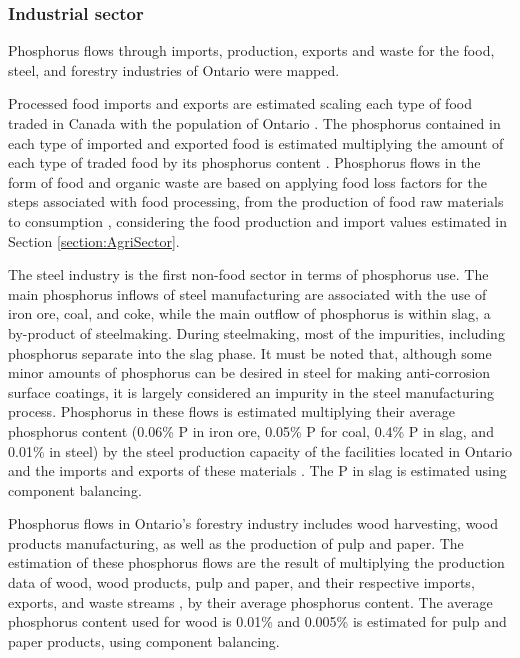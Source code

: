 \documentclass[authoryear]{elsarticle}
\begin{document}
\subsubsection{Industrial sector}
Phosphorus flows through imports, production, exports and waste for the food, steel, and forestry industries of Ontario were mapped.

Processed food imports and exports
are estimated scaling each type of food 
traded in Canada \citep{TradeDataOnlineCanada}
with the population of Ontario \citep{PopulationCanada}.
The phosphorus contained in each type of imported and exported food is estimated multiplying the amount of each type of traded food by its phosphorus content \citep{CanadianNutrientFile}. Phosphorus flows in the form of food and organic waste are based on applying food loss factors for the steps associated with food processing, from the production of food raw materials to consumption \citep{FoodLossesFAO}, considering the food production and import values estimated in Section \ref{section:AgriSector}.

The steel industry is the first non-food sector in terms of phosphorus use. The main phosphorus inflows of steel manufacturing are associated with the use of iron ore, coal, and coke, while the
main outflow of phosphorus is within slag, a by-product of steelmaking. During steelmaking, most of the impurities, including phosphorus separate into the slag phase.
It must be noted that, although some minor amounts of phosphorus can be desired in steel for making anti-corrosion surface coatings, it is largely considered an impurity in the steel manufacturing process. Phosphorus in these flows is estimated multiplying their average phosphorus content (0.06\% P in iron ore, 0.05\% P for coal, 0.4\% P in slag, and 0.01\% in steel) \citep{yokoyama2007separation} by the steel production capacity of the facilities located in Ontario \citep{CheminfoServices, AlgomaSteel, Stelco, PFlows_Ontario} and the imports and exports of these materials \citep{WorldIntegratedTradeSolution, InterprovincialImportsExports}. The P in slag is estimated using component balancing.

Phosphorus flows in Ontario's forestry industry includes wood harvesting, wood products manufacturing, as well as the production of pulp and paper. The estimation of these phosphorus flows are the result of multiplying the production data of wood, wood products, pulp and paper, and their respective imports, exports, and waste streams \citep{CanadianForestServiceStatistics, InterprovincialImportsExports}, by their average phosphorus content.
The average phosphorus content used for wood is 0.01\% \citep{sardans2013tree} and 0.005\% is estimated for pulp and paper products, using component balancing.
\end{document}
